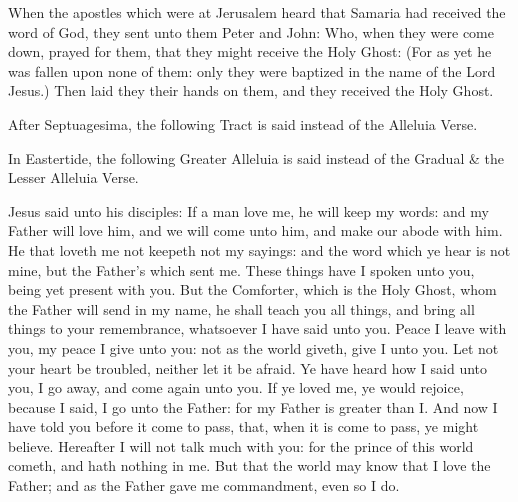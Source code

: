 When the apostles which were at Jerusalem heard that Samaria had received the word of God, they sent unto them Peter and John: Who, when they were come down, prayed for them, that they might receive the Holy Ghost: (For as yet he was fallen upon none of them: only they were baptized in the name of the Lord Jesus.) Then laid they their hands on them, and they received the Holy Ghost.

\clearpage
{}

\begin{rubric}
    After Septuagesima, the following Tract is said instead of the Alleluia Verse.
\end{rubric}


\begin{rubric}
    In Eastertide, the following Greater Alleluia is said instead of the Gradual \& the Lesser Alleluia Verse.
\end{rubric}


 Jesus said unto his disciples: If a man love me, he will keep my words: and my Father will love him, and we will come unto him, and make our abode with him. He that loveth me not keepeth not my sayings: and the word which ye hear is not mine, but the Father's which sent me. These things have I spoken unto you, being yet present with you. But the Comforter, which is the Holy Ghost, whom the Father will send in my name, he shall teach you all things, and bring all things to your remembrance, whatsoever I have said unto you. Peace I leave with you, my peace I give unto you: not as the world giveth, give I unto you. Let not your heart be troubled, neither let it be afraid. Ye have heard how I said unto you, I go away, and come again unto you. If ye loved me, ye would rejoice, because I said, I go unto the Father: for my Father is greater than I. And now I have told you before it come to pass, that, when it is come to pass, ye might believe. Hereafter I will not talk much with you: for the prince of this world cometh, and hath nothing in me. But that the world may know that I love the Father; and as the Father gave me commandment, even so I do.

